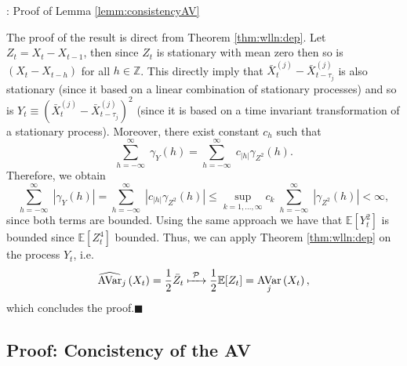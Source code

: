 \documentclass[envcountsect,usenames,dvipsnames]{beamer}
\DeclareMathOperator{\AV}{AVar}
\theoremstyle{mystyle}
\begin{document}
\begin{frame}{\thesubsection: Proof of Lemma \ref{lemm:consistencyAV}}

\footnotesize
The proof of the result is direct from Theorem \ref{thm:wlln:dep}. Let $Z_t = X_t - X_{t-1}$, then since $Z_t$ is stationary with mean zero then so is $(X_t - X_{t-h})$ for all $h \in \mathbb{Z}$. This directly imply that $\bar{X}_{t}^{(j)} - \bar{X}_{t-\tau_j}^{(j)}$ is also stationary (since it based on a linear combination of stationary processes) and so is $Y_t \equiv (\bar{X}_{t}^{(j)} - \bar{X}_{t-\tau_j}^{(j)})^2$ (since it is based on a time invariant transformation of a stationary process). Moreover, there exist constant $c_h$ such that
%
\begin{equation*}
    \sum_{h = -\infty}^{\infty} \; \gamma_Y (h) = \sum_{h = -\infty}^{\infty} \; c_{|h|} \gamma_{Z^2} (h).
\end{equation*}
%
Therefore, we obtain
%
\begin{equation*}
    \sum_{h = -\infty}^{\infty} \; |\gamma_Y (h)| = \sum_{h = -\infty}^{\infty} \; |c_{|h|} \gamma_{Z^2} (h)| \leq \sup_{k = 1, ..., \infty} c_k \; \sum_{h = -\infty}^{\infty} \; |\gamma_{Z^2} (h)| < \infty,
\end{equation*}
%
since both terms are bounded. Using the same approach we have that $\mathbb{E}\left[Y_t^2\right]$ is bounded since $\mathbb{E}\left[Z_t^4\right]$ bounded. Thus, we can apply Theorem \ref{thm:wlln:dep} on the process $Y_t$, i.e.
%
\begin{equation*}
    \widehat{\AV}_j \left(X_t \right) = \frac{1}{2} \bar{Z}_t \xmapsto[\;\;\;\;\; ]{\mathcal{P}} \frac{1}{2} \mathbb{E}[{Z}_t] = \AV_j \left(X_t \right),
\end{equation*}
%
which concludes the proof.\hfill $\blacksquare$

\hyperlink{lemm:consistencyAV}{}

\end{frame}



\subsection{Proof: Concistency of the AV}
\label{proof:lemma:asy:av} 
\end{document}
